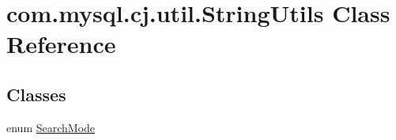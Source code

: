 \hypertarget{classcom_1_1mysql_1_1cj_1_1util_1_1_string_utils}{}\section{com.\+mysql.\+cj.\+util.\+String\+Utils Class Reference}
\label{classcom_1_1mysql_1_1cj_1_1util_1_1_string_utils}
\subsection*{Classes}
\begin{DoxyCompactItemize}
\item 
enum \mbox{\hyperlink{enumcom_1_1mysql_1_1cj_1_1util_1_1_string_utils_1_1_search_mode}{Search\+Mode}}
\end{DoxyCompactItemize}
